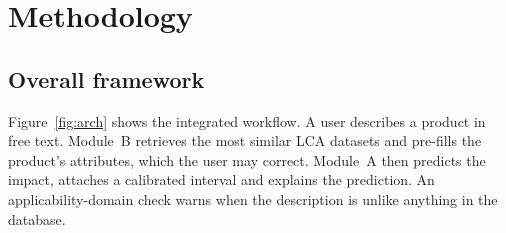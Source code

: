 \chapter{Methodology}
\label{ch:method}

\section{Overall framework}

Figure~\ref{fig:arch} shows the integrated workflow. A user describes a product in free text.
Module~B retrieves the most similar LCA datasets and pre-fills the product's attributes, which the
user may correct. Module~A then predicts the impact, attaches a calibrated interval and explains the
prediction. An applicability-domain check warns when the description is unlike anything in the
database.

